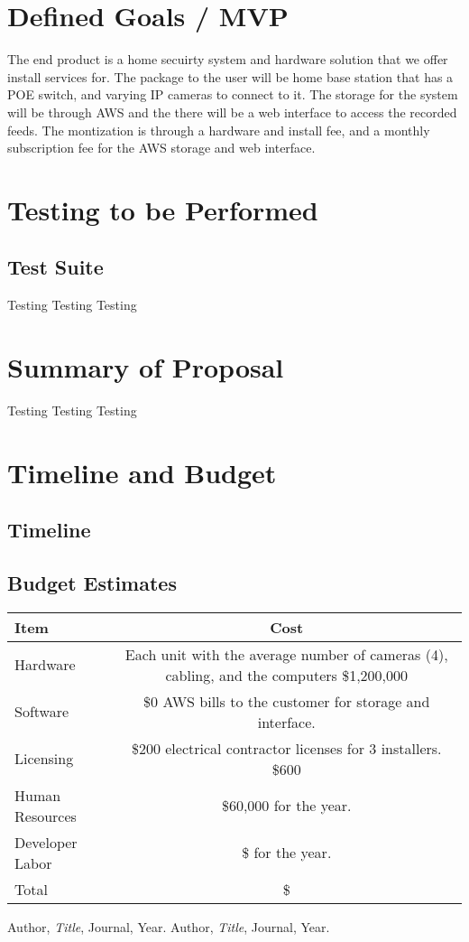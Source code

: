\documentclass{report}
\begin{document}
\chapter{Defined Goals / MVP}
The end product is a home secuirty system and hardware solution that we offer install services for. 
The package to the user will be home base station that has a POE switch, and varying IP cameras to connect to it. 
The storage for the system will be through AWS and the there will be a web interface to access the recorded feeds. 
The montization is through a hardware and install fee, and a monthly subscription fee for the AWS storage and web interface. 

\chapter{Testing to be Performed}
\section{Test Suite}
Testing Testing Testing

\chapter{Summary of Proposal}
Testing Testing Testing

\chapter{Timeline and Budget}
\section{Timeline}

\section{Budget Estimates}
\begin{tabular}{|l|c|}
\hline
Item & Cost \\
\hline
Hardware & Each unit with the average number of cameras (4), cabling, and the computers \$1,200,000 \\
Software & \$0 AWS bills to the customer for storage and interface. \\
Licensing & \$200 electrical contractor licenses for 3 installers. \$600 \\
Human Resources & \$60,000 for the year. \\
Developer Labor & \$ for the year. \\
\hline
Total & \$ \\
\hline
\end{tabular}

\begin{thebibliography}{9}
 Author, \textit{Title}, Journal, Year.
 Author, \textit{Title}, Journal, Year.
\end{thebibliography}
\end{document}
